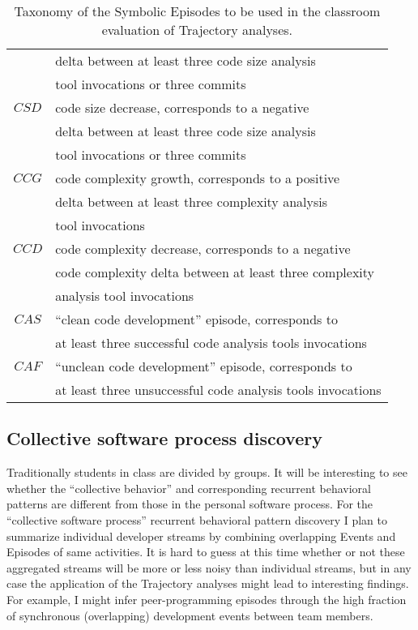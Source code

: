 \begin{table}
\begin{center}
\begin{tabular}{ | c | l | }
													& delta between at least three code size analysis \\
													& tool invocations or three commits \\
		\hline
		$CSD$ 								& code size decrease, corresponds to a negative \\
													& delta between at least three code size analysis \\
													& tool invocations or three commits \\																										
		\hline
		$CCG$ 								& code complexity growth, corresponds to a positive \\
													& delta between at least three complexity analysis \\
													& tool invocations \\
		\hline
		$CCD$ 								& code complexity decrease, corresponds to a negative \\
													& code complexity delta between at least three complexity \\
													& analysis tool invocations \\													
		\hline
		$CAS$ 								& ``clean code development'' episode, corresponds to \\
													& at least three successful code analysis tools invocations \\
		\hline
		$CAF$ 								& ``unclean code development'' episode, corresponds to \\
													& at least three unsuccessful code analysis tools invocations \\
		\hline		
	  \end{tabular}
    \caption{Taxonomy of the Symbolic Episodes to be used in the classroom evaluation of Trajectory analyses.}
    \label{fig:data_collected_intervals}
    \end{center}
\end{table}

\subsection{Collective software process discovery}
Traditionally students in class are divided by groups. It will be interesting to see whether the ``collective behavior'' and corresponding recurrent behavioral patterns are different from those in the personal software process. For the ``collective software process'' recurrent behavioral pattern discovery I plan to summarize individual developer streams by combining overlapping Events and Episodes of same activities. It is hard to guess at this time whether or not these aggregated streams will be more or less noisy than individual streams, but in any case the application of the Trajectory analyses might lead to interesting findings. For example, I might infer peer-programming episodes through the high fraction of synchronous (overlapping) development events between team members.
